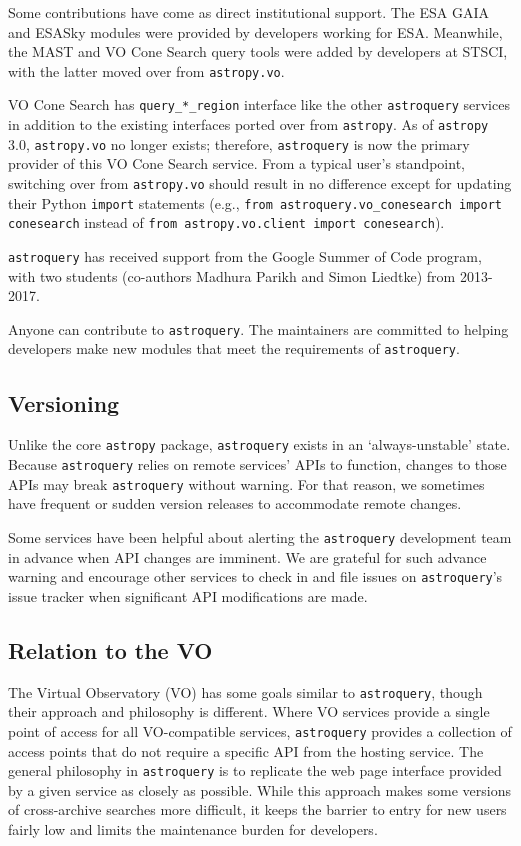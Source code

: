 \documentclass[twocolumn]{aastex61}
\newcommand{\package}[1]{\texttt{#1}\xspace}
\newcommand{\astroquery}{\package{astroquery}}
\newcommand{\astropypkg}{\package{astropy}}
\begin{document}
Some contributions have come as direct institutional support.  The ESA GAIA and
ESASky modules were provided by developers working for ESA.  Meanwhile,
the MAST and VO Cone Search query tools were added by developers at STSCI,
with the latter moved over from \texttt{astropy.vo}.

VO Cone Search has \texttt{query\_*\_region} interface like the other
\astroquery services in addition to the existing interfaces ported over from
\astropypkg. As of \astropypkg 3.0, \texttt{astropy.vo} no longer exists;
therefore, \astroquery is now the primary provider of this VO Cone Search
service. From a typical user's standpoint, switching over from
\texttt{astropy.vo} should result in no difference except for updating their
Python \texttt{import} statements (e.g., \texttt{from astroquery.vo\_conesearch import
conesearch} instead of \texttt{from astropy.vo.client import conesearch}).

\astroquery has received support from the Google Summer of Code
program, with two students (co-authors Madhura Parikh and Simon Liedtke)
from 2013-2017.

Anyone can contribute to \astroquery.  The maintainers are committed to helping
developers make new modules that meet the requirements of \astroquery.

\subsection{Versioning}
Unlike the core \astropypkg package, \astroquery exists in an `always-unstable' state.
Because \astroquery relies on remote services' APIs to function, changes to those
APIs may break \astroquery without warning.  For that reason, we sometimes have
frequent or sudden version releases to accommodate remote changes.

Some services have been helpful about alerting the \astroquery development team
in advance when API changes are imminent.  We are grateful for such advance
warning and encourage other services to check in and file issues on \astroquery's
issue tracker when significant API modifications are made.

\subsection{Relation to the VO}

The Virtual Observatory (VO) has some goals similar to \astroquery,
though their approach and philosophy is different.  Where VO services provide a
single point of access for all VO-compatible services, \astroquery
provides a collection of access points that do not require a specific API from
the hosting service.  The general philosophy in \astroquery is to
replicate the web page interface provided by a given service as closely as
possible.  While this approach makes some versions of cross-archive searches
more difficult, it keeps the barrier to entry for new users fairly low and limits
the maintenance burden for developers.
\end{document}

